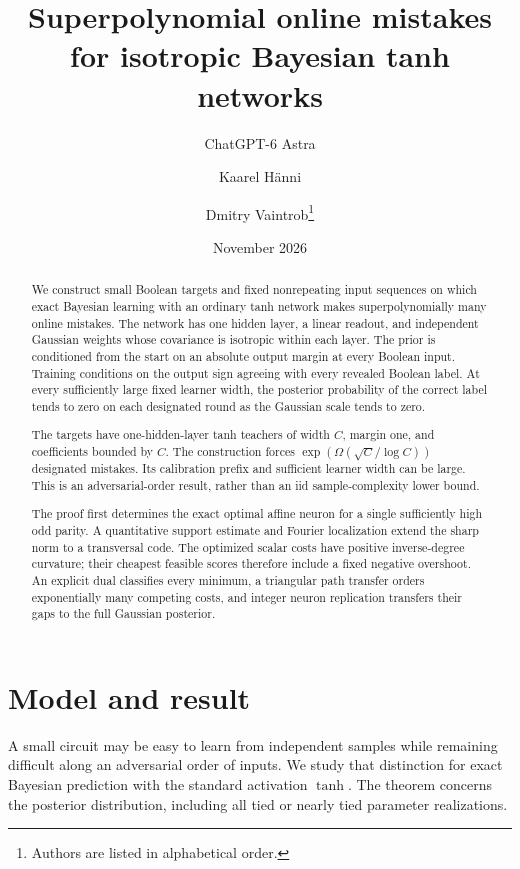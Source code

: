 \documentclass[11pt]{article}
\title{Superpolynomial online mistakes for isotropic Bayesian tanh networks}
\author{ChatGPT-6 Astra \and Kaarel H\"anni \and Dmitry Vaintrob\thanks{Authors are listed in alphabetical order.}}
\date{November 2026}
\theoremstyle{remark}\newtheorem{remark}[theorem]{Remark}
\begin{document}
\maketitle
\begin{abstract}
We construct small Boolean targets and fixed nonrepeating input
sequences on which exact Bayesian learning with an ordinary tanh
network makes superpolynomially many online mistakes. The network has
one hidden layer, a linear readout, and independent Gaussian weights
whose covariance is isotropic within each layer. The prior is
conditioned from the start on an absolute output margin at every
Boolean input. Training conditions on the output sign agreeing with
every revealed Boolean label.
At every sufficiently large fixed learner width, the posterior
probability of the correct label tends to zero on each designated
round as the Gaussian scale tends to zero.

The targets have one-hidden-layer tanh teachers of width $C$, margin
one, and coefficients bounded by $C$. The construction forces
$\exp(\Omega(\sqrt C/\log C))$ designated mistakes. Its calibration prefix
and sufficient learner width can be large. This is an adversarial-order
result, rather than an iid sample-complexity lower bound.

The proof first determines the exact optimal affine neuron for a
single sufficiently high odd parity. A quantitative support estimate
and Fourier localization extend the sharp norm to a transversal code.
The optimized scalar costs have positive inverse-degree curvature;
their cheapest feasible scores therefore include a fixed negative
overshoot. An explicit dual classifies every minimum, a triangular path
transfer orders exponentially many competing costs, and integer neuron
replication transfers their gaps to the full Gaussian posterior.
\end{abstract}

\section{Model and result}

A small circuit may be easy to learn from independent samples while
remaining difficult along an adversarial order of inputs. We study
that distinction for exact Bayesian prediction with the standard
activation $\tanh$. The theorem concerns the posterior distribution,
including all tied or nearly tied parameter realizations.
\end{document}

